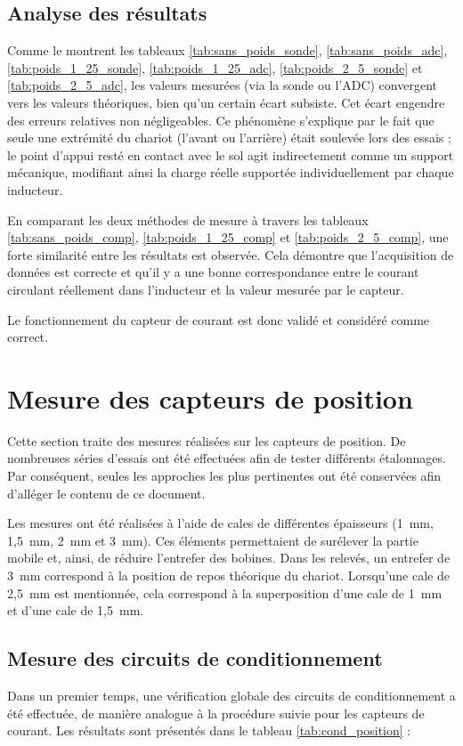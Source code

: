 \subsection{Analyse des résultats}
Comme le montrent les tableaux \ref{tab:sans_poids_sonde}, \ref{tab:sans_poids_adc}, \ref{tab:poids_1_25_sonde}, \ref{tab:poids_1_25_adc}, \ref{tab:poids_2_5_sonde} et \ref{tab:poids_2_5_adc}, les valeurs mesurées (via la sonde ou l'ADC) convergent vers les valeurs théoriques, bien qu'un certain écart subsiste. Cet écart engendre des erreurs relatives non négligeables. Ce phénomène s'explique par le fait que seule une extrémité du chariot (l'avant ou l'arrière) était soulevée lors des essais ; le point d'appui resté en contact avec le sol agit indirectement comme un support mécanique, modifiant ainsi la charge réelle supportée individuellement par chaque inducteur.

En comparant les deux méthodes de mesure à travers les tableaux \ref{tab:sans_poids_comp}, \ref{tab:poids_1_25_comp} et \ref{tab:poids_2_5_comp}, une forte similarité entre les résultats est observée. Cela démontre que l'acquisition de données est correcte et qu'il y a une bonne correspondance entre le courant circulant réellement dans l'inducteur et la valeur mesurée par le capteur.

Le fonctionnement du capteur de courant est donc validé et considéré comme correct.

\section{Mesure des capteurs de position}
Cette section traite des mesures réalisées sur les capteurs de position. De nombreuses séries d'essais ont été effectuées afin de tester différents étalonnages. Par conséquent, seules les approches les plus pertinentes ont été conservées afin d'alléger le contenu de ce document.

Les mesures ont été réalisées à l'aide de cales de différentes épaisseurs (1~mm, 1,5~mm, 2~mm et 3~mm). Ces éléments permettaient de surélever la partie mobile et, ainsi, de réduire l'entrefer des bobines. Dans les relevés, un entrefer de 3~mm correspond à la position de repos théorique du chariot. Lorsqu'une cale de 2,5~mm est mentionnée, cela correspond à la superposition d'une cale de 1~mm et d'une cale de 1,5~mm.

\subsection{Mesure des circuits de conditionnement}
Dans un premier temps, une vérification globale des circuits de conditionnement a été effectuée, de manière analogue à la procédure suivie pour les capteurs de courant. Les résultats sont présentés dans le tableau \ref{tab:cond_position} :

